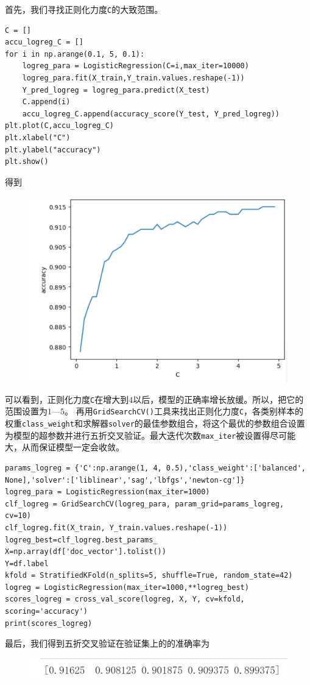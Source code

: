 \documentclass{article}
\begin{document}
首先，我们寻找正则化力度\lstinline|C|的大致范围。
\begin{lstlisting}
C = []
accu_logreg_C = []
for i in np.arange(0.1, 5, 0.1):
    logreg_para = LogisticRegression(C=i,max_iter=10000)
    logreg_para.fit(X_train,Y_train.values.reshape(-1))
    Y_pred_logreg = logreg_para.predict(X_test)
    C.append(i)
    accu_logreg_C.append(accuracy_score(Y_test, Y_pred_logreg))
plt.plot(C,accu_logreg_C)
plt.xlabel("C")
plt.ylabel("accuracy")
plt.show()
\end{lstlisting}

得到
\begin{figure}[h]
    \centering
    \includegraphics[width=0.5\linewidth]{image1.png}
    \label{fig:enter-label}
\end{figure}

可以看到，正则化力度\lstinline|C|在增大到$4$以后，模型的正确率增长放缓。所以，把它的范围设置为$1$—$5$。
再用\lstinline|GridSearchCV()|工具来找出正则化力度\lstinline|C|，各类别样本的权重\lstinline|class_weight|和求解器\lstinline|solver|的最佳参数组合，将这个最优的参数组合设置为模型的超参数并进行五折交叉验证。最大迭代次数\lstinline|max_iter|被设置得尽可能大，从而保证模型一定会收敛。
\begin{lstlisting}
params_logreg = {'C':np.arange(1, 4, 0.5),'class_weight':['balanced', None],'solver':['liblinear','sag','lbfgs','newton-cg']}
logreg_para = LogisticRegression(max_iter=1000)
clf_logreg = GridSearchCV(logreg_para, param_grid=params_logreg, cv=10)
clf_logreg.fit(X_train, Y_train.values.reshape(-1))
logreg_best=clf_logreg.best_params_
X=np.array(df['doc_vector'].tolist())
Y=df.label
kfold = StratifiedKFold(n_splits=5, shuffle=True, random_state=42)
logreg = LogisticRegression(max_iter=1000,**logreg_best)
scores_logreg = cross_val_score(logreg, X, Y, cv=kfold, scoring='accuracy')
print(scores_logreg)
\end{lstlisting}

最后，我们得到五折交叉验证在验证集上的的准确率为
\begin{figure}[h]
    \centering
    \includegraphics[width=0.5\linewidth]{image2.png}
    \label{fig:enter-label}
\end{figure}
\end{document}
